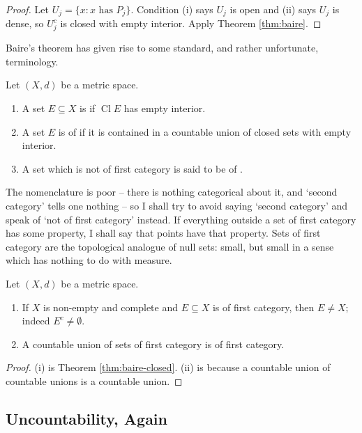 \documentclass[a4paper]{scrartcl}
\newcommand{\Cl}{\operatorname{Cl}}
\begin{document}
\begin{proof}
	Let $U_j = \{x : x \text{ has } P_j\}$. Condition (i) says $U_j$ is open and (ii) says $U_j$ is dense, so $U_j^c$ is closed with empty interior. Apply Theorem \ref{thm:baire}.
\end{proof}

Baire's theorem has given rise to some standard, and rather unfortunate, terminology.

\begin{definition}[Category]
	Let $(X,d)$ be a metric space.
	\begin{enumerate}[label=(\roman*)]
		\item A set $E\subseteq X$ is  if $\Cl E$ has empty interior.
		\item A set $E$ is of  if it is contained in a countable union of closed sets with empty interior.
		\item A set which is not of first category is said to be of .
	\end{enumerate}
\end{definition}

The nomenclature is poor -- there is nothing categorical about it, and `second category' tells one nothing -- so I shall try to avoid saying `second category' and speak of `not of first category' instead. If everything outside a set of first category has some property, I shall say that  points have that property. Sets of first category are the topological analogue of null sets: small, but small in a sense which has nothing to do with measure.

\begin{lemma}\label{lem:first-cat}
	Let $(X,d)$ be a metric space.
	\begin{enumerate}[label=(\roman*)]
		\item If $X$ is non-empty and complete and $E\subseteq X$ is of first category, then $E\neq X$; indeed $E^c\neq\emptyset$.
		\item A countable union of sets of first category is of first category.
	\end{enumerate}
\end{lemma}

\begin{proof}
	(i) is Theorem \ref{thm:baire-closed}. (ii) is because a countable union of countable unions is a countable union.
\end{proof}

\subsection{Uncountability, Again}
\end{document}
